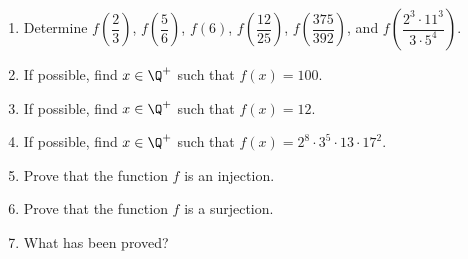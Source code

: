 \begin{enumerate}
\begin{enumerate}
\item Determine $f \!\left( \dfrac{2}{3} \right)$, $f \!\left( \dfrac{5}{6} \right)$, 
$f ( 6 )$, $f ( \dfrac{12}{25} )$, 
$f \!\left( \dfrac{375}{392} \right)$, and $f \!\left( \dfrac{2^3 \cdot 11^3}{3 \cdot 5^4} \right)$.

\item If possible, find $x \in \Q^+$ such that $f(x) = 100$.

\item If possible, find $x \in \Q^+$ such that $f(x) = 12$.

\item If possible, find $x \in \Q^+$ such that $f(x) = 2^8 \cdot 3^5 \cdot 13 \cdot 17^2$.

\item Prove that the function $f$ is an injection.

\item Prove that the function $f$ is a surjection.

\item What has been proved?
\end{enumerate}
\end{enumerate}


\hbreak


\endinput




